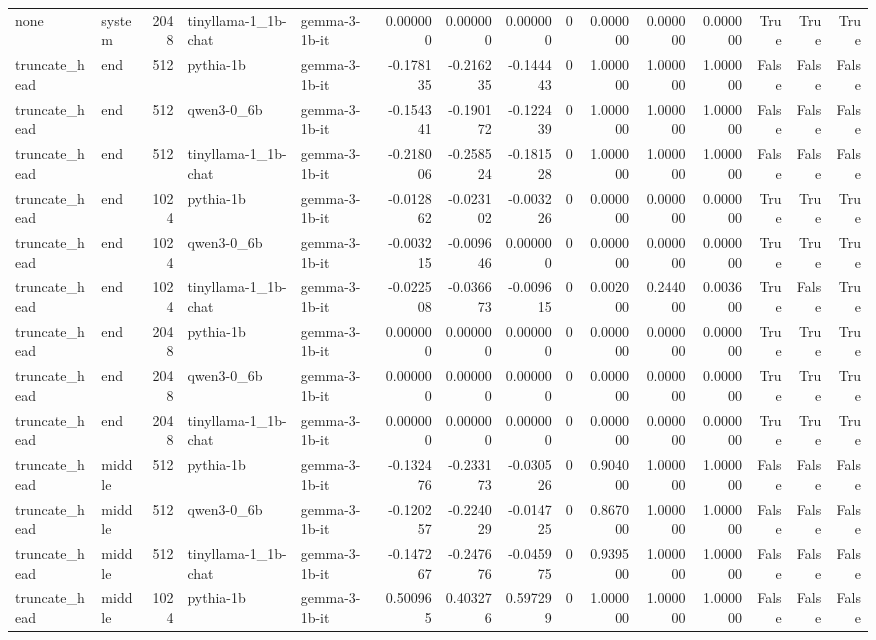 \begin{tabular}{llrllrrrrrrrrrr}
none & system & 2048 & tinyllama-1_1b-chat & gemma-3-1b-it & 0.000000 & 0.000000 & 0.000000 & 0 & 0.000000 & 0.000000 & 0.000000 & True & True & True \\
truncate_head & end & 512 & pythia-1b & gemma-3-1b-it & -0.178135 & -0.216235 & -0.144443 & 0 & 1.000000 & 1.000000 & 1.000000 & False & False & False \\
truncate_head & end & 512 & qwen3-0_6b & gemma-3-1b-it & -0.154341 & -0.190172 & -0.122439 & 0 & 1.000000 & 1.000000 & 1.000000 & False & False & False \\
truncate_head & end & 512 & tinyllama-1_1b-chat & gemma-3-1b-it & -0.218006 & -0.258524 & -0.181528 & 0 & 1.000000 & 1.000000 & 1.000000 & False & False & False \\
truncate_head & end & 1024 & pythia-1b & gemma-3-1b-it & -0.012862 & -0.023102 & -0.003226 & 0 & 0.000000 & 0.000000 & 0.000000 & True & True & True \\
truncate_head & end & 1024 & qwen3-0_6b & gemma-3-1b-it & -0.003215 & -0.009646 & 0.000000 & 0 & 0.000000 & 0.000000 & 0.000000 & True & True & True \\
truncate_head & end & 1024 & tinyllama-1_1b-chat & gemma-3-1b-it & -0.022508 & -0.036673 & -0.009615 & 0 & 0.002000 & 0.244000 & 0.003600 & True & False & True \\
truncate_head & end & 2048 & pythia-1b & gemma-3-1b-it & 0.000000 & 0.000000 & 0.000000 & 0 & 0.000000 & 0.000000 & 0.000000 & True & True & True \\
truncate_head & end & 2048 & qwen3-0_6b & gemma-3-1b-it & 0.000000 & 0.000000 & 0.000000 & 0 & 0.000000 & 0.000000 & 0.000000 & True & True & True \\
truncate_head & end & 2048 & tinyllama-1_1b-chat & gemma-3-1b-it & 0.000000 & 0.000000 & 0.000000 & 0 & 0.000000 & 0.000000 & 0.000000 & True & True & True \\
truncate_head & middle & 512 & pythia-1b & gemma-3-1b-it & -0.132476 & -0.233173 & -0.030526 & 0 & 0.904000 & 1.000000 & 1.000000 & False & False & False \\
truncate_head & middle & 512 & qwen3-0_6b & gemma-3-1b-it & -0.120257 & -0.224029 & -0.014725 & 0 & 0.867000 & 1.000000 & 1.000000 & False & False & False \\
truncate_head & middle & 512 & tinyllama-1_1b-chat & gemma-3-1b-it & -0.147267 & -0.247676 & -0.045975 & 0 & 0.939500 & 1.000000 & 1.000000 & False & False & False \\
truncate_head & middle & 1024 & pythia-1b & gemma-3-1b-it & 0.500965 & 0.403276 & 0.597299 & 0 & 1.000000 & 1.000000 & 1.000000 & False & False & False \\

\end{tabular}

